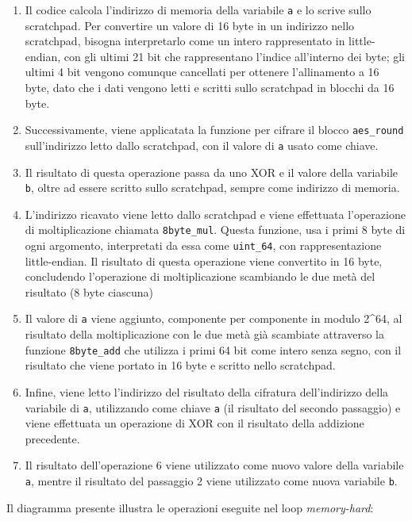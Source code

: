 \documentclass[
]{article}
\begin{document}
\begin{enumerate}
\def\labelenumi{\arabic{enumi}.}
\item
  Il codice calcola l'indirizzo di memoria della variabile \texttt{a} e
  lo scrive sullo scratchpad. Per convertire un valore di 16 byte in un
  indirizzo nello scratchpad, bisogna interpretarlo come un intero
  rappresentato in little-endian, con gli ultimi 21 bit che
  rappresentano l'indice all'interno dei byte; gli ultimi 4 bit vengono
  comunque cancellati per ottenere l'allinamento a 16 byte, dato che i
  dati vengono letti e scritti sullo scratchpad in blocchi da 16 byte.
\item
  Successivamente, viene applicatata la funzione per cifrare il blocco
  \texttt{aes\_round} sull'indirizzo letto dallo scratchpad, con il
  valore di \texttt{a} usato come chiave.
\item
  Il risultato di questa operazione passa da uno XOR e il valore della
  variabile \texttt{b}, oltre ad essere scritto sullo scratchpad, sempre
  come indirizzo di memoria.
\item
  L'indirizzo ricavato viene letto dallo scratchpad e viene effettuata
  l'operazione di moltiplicazione chiamata \texttt{8byte\_mul}. Questa
  funzione, usa i primi 8 byte di ogni argomento, interpretati da essa
  come \texttt{uint\_64}, con rappresentazione little-endian. Il
  risultato di questa operazione viene convertito in 16 byte,
  concludendo l'operazione di moltiplicazione scambiando le due metà del
  risultato (8 byte ciascuna)
\item
  Il valore di \texttt{a} viene aggiunto, componente per componente in
  modulo 2\^{}64, al risultato della moltiplicazione con le due metà già
  scambiate attraverso la funzione \texttt{8byte\_add} che utilizza i
  primi 64 bit come intero senza segno, con il risultato che viene
  portato in 16 byte e scritto nello scratchpad.
\item
  Infine, viene letto l'indirizzo del risultato della cifratura
  dell'indirizzo della variabile di \texttt{a}, utilizzando come chiave
  \texttt{a} (il risultato del secondo passaggio) e viene effettuata un
  operazione di XOR con il risultato della addizione precedente.
\item
  Il risultato dell'operazione 6 viene utilizzato come nuovo valore
  della variabile \texttt{a}, mentre il risultato del passaggio 2 viene
  utilizzato come nuova variabile \texttt{b}.
\end{enumerate}

Il diagramma presente illustra le operazioni eseguite nel loop
\emph{memory-hard}:
\end{document}
